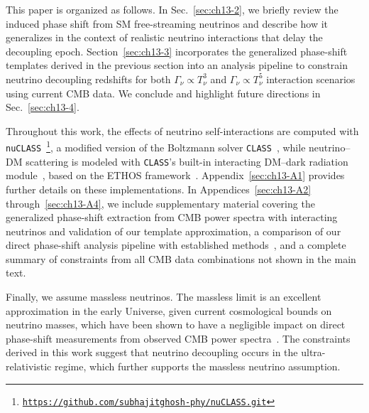 This paper is organized as follows. In Sec.~\ref{sec:ch13-2}, we briefly review the induced phase shift from SM free-streaming neutrinos and describe how it generalizes in the context of realistic neutrino interactions that delay the decoupling epoch. Section~\ref{sec:ch13-3} incorporates the generalized phase-shift templates derived in the previous section into an analysis pipeline to constrain neutrino decoupling redshifts for both $\Gamma_\nu \propto T_\nu^3$ and $\Gamma_\nu \propto T_\nu^5$ interaction scenarios using current CMB data. We conclude and highlight future directions in Sec.~\ref{sec:ch13-4}.

Throughout this work, the effects of neutrino self-interactions are computed with \texttt{nuCLASS}~\cite{Libanore:2025ack}\footnote{\href{https://github.com/subhajitghosh-phy/nuCLASS.git}{\texttt{https://github.com/subhajitghosh-phy/nuCLASS.git}}}, a modified version of the Boltzmann solver \texttt{CLASS}~\cite{Blas:2011rf}, while neutrino--DM scattering is modeled with \texttt{CLASS}'s built-in interacting DM--dark radiation module~\cite{Archidiacono:2019wdp}, based on the ETHOS framework~\cite{Cyr-Racine:2015ihg}. Appendix~\ref{sec:ch13-A1} provides further details on these implementations. In Appendices~\ref{sec:ch13-A2} through~\ref{sec:ch13-A4}, we include supplementary material covering the generalized phase-shift extraction from CMB power spectra with interacting neutrinos and validation of our template approximation, a comparison of our direct phase-shift analysis pipeline with established methods~\cite{Follin:2015hya,Montefalcone:2025unv}, and a complete summary of constraints from all CMB data combinations not shown in the main text.

Finally, we assume massless neutrinos. The massless limit is an excellent approximation in the early Universe, given current cosmological bounds on neutrino masses, which have been shown to have a negligible impact on direct phase-shift measurements from observed CMB power spectra~\cite{Montefalcone:2025unv}. The constraints derived in this work suggest that neutrino decoupling occurs in the ultra-relativistic regime, which further supports the massless neutrino assumption.

